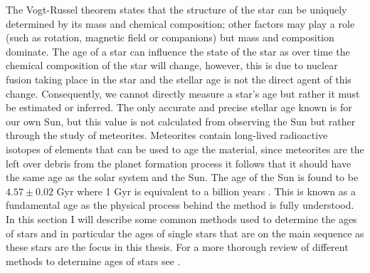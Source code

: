 The Vogt-Russel theorem states that the structure of the star can be uniquely determined by its mass and chemical composition; other factors may play a role (such as rotation, magnetic field or companions) but mass and composition dominate. The age of a star can influence the state of the star as over time the chemical composition of the star will change, however, this is due to nuclear fusion taking place in the star and the stellar age is not the direct agent of this change. Consequently, we cannot directly measure a star's age but rather it must be estimated or inferred. The only accurate and precise stellar age known is for our own Sun, but this value is not calculated from observing the Sun but rather through the study of meteorites. Meteorites contain long-lived radioactive isotopes of elements that can be used to age the material, since meteorites are the left over debris from the planet formation process it follows that it should have the same age as the solar system and the Sun. The age of the Sun is found to be $4.57 \pm 0.02$ Gyr  where 1 Gyr is equivalent to a billion years \citep{Bahcall_etal_1995}. This is known as a fundamental age as the physical process behind the method is fully understood. In this section I will describe some common methods used to determine the ages of stars and in particular the ages of single stars that are on the main sequence as these stars are the focus in this thesis. For a more thorough review of different methods to determine ages of stars see \citet{Soderblom_2010}.


